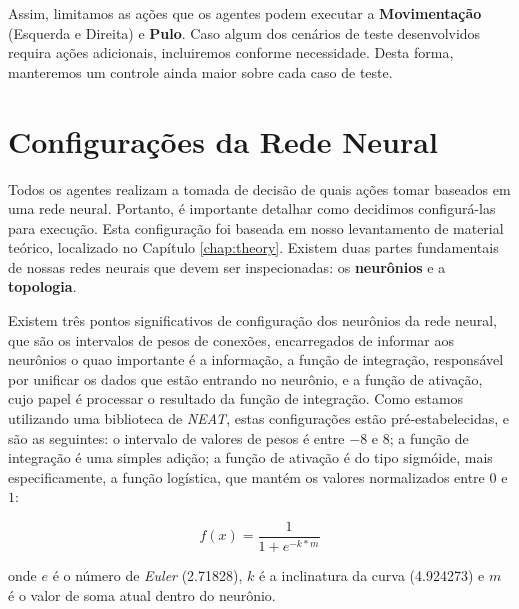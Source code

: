 Assim, limitamos as ações que os agentes podem executar a \textbf{Movimentação}
(Esquerda e Direita) e \textbf{Pulo}. Caso algum dos cenários de teste
desenvolvidos requira ações adicionais, incluiremos conforme necessidade. Desta
forma, manteremos um controle ainda maior sobre cada caso de teste.


\section{\label{section:modelling-network}Configurações da Rede Neural}
Todos os agentes realizam a tomada de decisão de quais ações tomar baseados em
uma rede neural. Portanto, é importante detalhar como decidimos configurá-las
para execução. Esta configuração foi baseada em nosso levantamento de material
teórico, localizado no Capítulo \ref{chap:theory}. Existem duas partes
fundamentais de nossas redes neurais que devem ser inspecionadas: os
\textbf{neurônios} e a \textbf{topologia}.

Existem três pontos significativos de configuração dos neurônios da rede neural,
que são os intervalos de pesos de conexões, encarregados de informar aos
neurônios o quao importante é a informação, a função de integração, responsável
por unificar os dados que estão entrando no neurônio, e a função de ativação,
cujo papel é processar o resultado da função de integração. Como estamos
utilizando uma biblioteca de \textit{NEAT}, estas configurações estão
pré-estabelecidas, e são as seguintes: o intervalo de valores de pesos é entre
$-8$ e $8$; a função de integração é uma simples adição; a função de ativação é
do tipo sigmóide, mais especificamente, a função logística, que mantém os
valores normalizados entre $0$ e $1$:

\begin{equation}
	\label{eq:neat-activation}
	f(x) = \frac{1}{1+e^{-k*m}}
\end{equation}

onde $e$ é o número de \textit{Euler} (2.71828), $k$ é a inclinatura da curva
(4.924273) e $m$ é o valor de soma atual dentro do neurônio.


